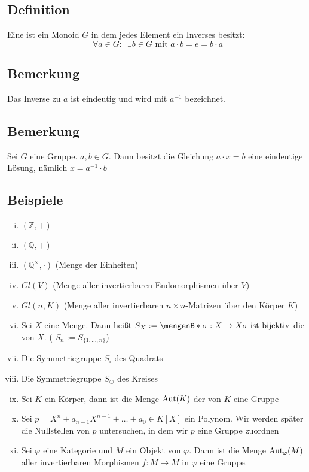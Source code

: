 \subsection[Definition: Gruppe]{Definition} %
\label{sub:12}
Eine  ist ein Monoid $G$ in dem jedes Element ein Inverses besitzt:
\[
	\forall a \in G : \enspace \exists b \in G \text{ mit } a \cdot b = e = b \cdot a
\] 

\subsection[Bemerkung: Eindeutigkeit des Inversen]{Bemerkung} %
\label{sub:13}
Das Inverse zu $a$ ist eindeutig und wird mit $a ^{-1}$ bezeichnet.

\subsection[Bemerkung: Lösbarkeit einfacher Gleichungen in Gruppen]{Bemerkung} %
\label{sub:14}
Sei $G$ eine Gruppe. $a, b \in G$. Dann besitzt die Gleichung $a \cdot x = b$ eine eindeutige Lösung, nämlich $x = a ^{-1} \cdot b$

\subsection[Beispiele für Gruppen]{Beispiele} %
\label{sub:15}
	\begin{enumerate}[i)]
		\item $(\mathds{Z}, +)$
		\item $ (\mathds{Q},+)$
		\item $(\mathds{Q}^\times, \cdot )$ \hfill {\small \color{light_gray}(Menge der Einheiten)}
		\item $Gl(V)$ \hfill {\small \color{light_gray} (Menge aller invertierbaren Endomorphismen über $V$)}
		\item $Gl(n,K)$ \hfill {\small \color{light_gray} (Menge aller invertierbaren $n \times n$-Matrizen über den Körper $K$)}
		\item \label{sym_grp} Sei $X$ eine Menge. Dann heißt $S_X := \set[\sigma : X \to X]{\sigma \text{ ist bijektiv}} $ die  von $X$. 
		( $S_n := S_{ \{ 1, \ldots , n\}} $) 
		\item Die Symmetriegruppe $S_\square$ des Quadrats
		\item Die Symmetriegruppe $S_\bigcirc$ des Kreises
		\item Sei $K$ ein Körper, dann ist die Menge $\operatorname{Aut}(K)$ der   von $K$ eine Gruppe
		\item Sei $p = X^n + a_{n-1} X^{n-1} + \ldots  + a_0 \in K[X]$ ein Polynom. Wir werden später die Nullstellen von $p$ untersuchen, in dem wir $p$ eine Gruppe 
		zuordnen
		\item Sei $\varphi$ eine Kategorie und $M$ ein Objekt von $\varphi$. Dann ist die Menge $\operatorname{Aut}_\varphi(M)$ aller invertierbaren Morphismen $f : M  \to M$ in $\varphi$
		eine Gruppe.
	\end{enumerate}

